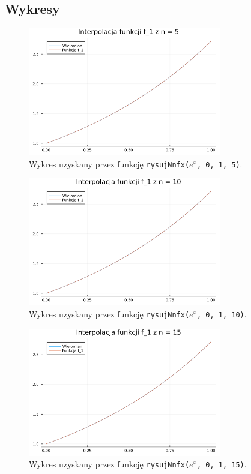 \documentclass{article}
\begin{document}
\subsection{Wykresy}
\begin{figure}[H]
\centering
\includegraphics[width=0.75\textwidth]{task5_f1_n5.png}
\caption{Wykres uzyskany przez funkcję \texttt{rysujNnfx($e^x$, 0, 1, 5)}.}
\end{figure}

\begin{figure}[H]
\centering
\includegraphics[width=0.75\textwidth]{task5_f1_n10.png}
\caption{Wykres uzyskany przez funkcję \texttt{rysujNnfx($e^x$, 0, 1, 10)}.}
\end{figure}

\begin{figure}[H]
\centering
\includegraphics[width=0.75\textwidth]{task5_f1_n15.png}
\caption{Wykres uzyskany przez funkcję \texttt{rysujNnfx($e^x$, 0, 1, 15)}.}
\end{figure}
\end{document}

